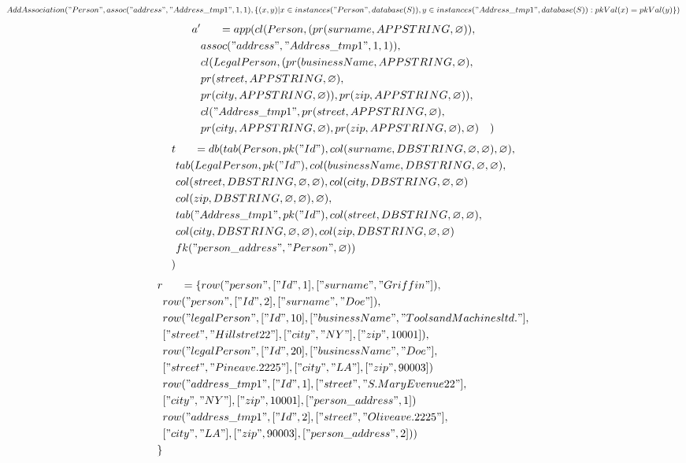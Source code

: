 \documentclass[11pt]{article}
\begin{document}
\newpage
$AddAssociation("Person", assoc("address", "Address\_tmp1", 1, 1), 
 \{(x,y)| x \in instances("Person", database(S)), y \in instances("Address\_tmp1", database(S)) : pkVal(x) = pkVal(y) \})$
\begin{align*}
a' & \;\;\;\;\;\; =app(cl(Person, (pr(surname, APPSTRING, \varnothing)), \\ 
& assoc("address", "Address\_tmp1", 1, 1)), \\ 
& cl(LegalPerson, (pr(businessName, APPSTRING, \varnothing), \\
& pr(street, APPSTRING, \varnothing), \\
& pr(city, APPSTRING, \varnothing)), pr(zip, APPSTRING, \varnothing)), \\
& cl("Address\_tmp1", pr(street, APPSTRING, \varnothing), \\
& pr(city, APPSTRING, \varnothing), pr(zip, APPSTRING, \varnothing), \varnothing)
& )
\end{align*}
\begin{align*}
t & \;\;\;\;\;\; =db(tab(Person, pk("Id"), col(surname, DBSTRING, \varnothing, \varnothing), \varnothing), \\
& tab(LegalPerson, pk("Id"),  col(businessName, DBSTRING, \varnothing, \varnothing), \\
& col(street, DBSTRING, \varnothing, \varnothing), col(city, DBSTRING, \varnothing, \varnothing) \\
& col(zip, DBSTRING, \varnothing, \varnothing), \varnothing), \\
& tab("Address\_tmp1", pk("Id"), col(street, DBSTRING, \varnothing, \varnothing),\\
& col(city, DBSTRING, \varnothing, \varnothing), col(zip, DBSTRING, \varnothing, \varnothing) \\
& fk("person\_address", "Person", \varnothing))\\
) 
\end{align*}
\begin{align*}
r & \;\;\;\;\;\; =\{ row("person", ["Id", 1], ["surname", "Griffin"]), \\
& row("person", ["Id", 2], ["surname", "Doe"]), \\
& row("legalPerson", ["Id", 10], ["businessName", "Tools and Machines ltd."], \\
& ["street", "Hill stret 22"], ["city", "NY"], ["zip", 10001]), \\
& row("legalPerson", ["Id", 20], ["businessName", "Doe"], \\
& ["street", "Pine ave. 2225"], ["city", "LA"], ["zip", 90003])\\
& row("address\_tmp1", ["Id", 1], ["street", "S. Mary Evenue 22"], \\
& ["city", "NY"], ["zip", 10001], ["person\_address", 1]) \\
& row("address\_tmp1", ["Id", 2], ["street", "Olive ave. 2225"], \\
& ["city", "LA"], ["zip", 90003], ["person\_address", 2]) )\\
\}
\end{align*}
\end{document}

